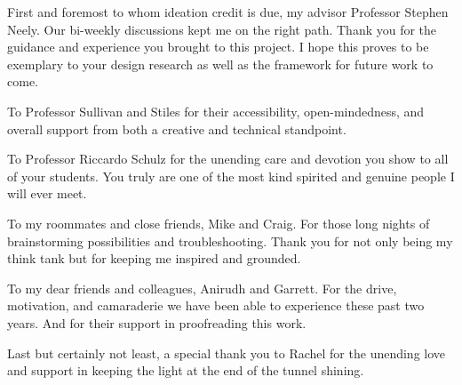 
\setlength{\parskip}{1em}
\setlength{\parindent}{0em}

\noindent
First and foremost to whom ideation credit is due, my advisor Professor Stephen Neely. Our bi-weekly discussions kept me on the right path. Thank you for the guidance and experience you brought to this project. I hope this proves to be exemplary to your design research as well as the framework for future work to come.

To Professor Sullivan and Stiles for their accessibility, open-mindedness, and overall support from both a creative and technical standpoint.

To Professor Riccardo Schulz for the unending care and devotion you show to all of your students. You truly are one of the most kind spirited and genuine people I will ever meet.

To my roommates and close friends, Mike and Craig. For those long nights of brainstorming possibilities and troubleshooting. Thank you for not only being my think tank but for keeping me inspired and grounded.

To my dear friends and colleagues, Anirudh and Garrett. For the drive, motivation, and camaraderie we have been able to experience these past two years. And for their support in proofreading this work.

Last but certainly not least, a special thank you to Rachel for the unending love and support in keeping the light at the end of the tunnel shining.